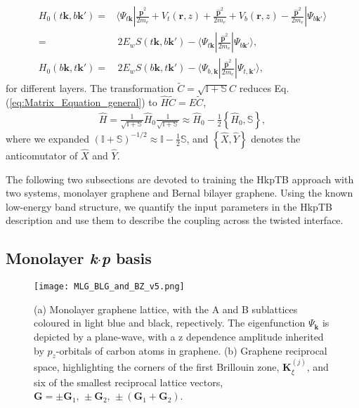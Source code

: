 \documentclass[showpacs,aps,prb,reprint,twocolumn]{revtex4-1}
\begin{document}
\begin{subequations}\label{eq:H0_general}
\begin{align}
H_0(t\boldsymbol{k},b\boldsymbol{k}')\!=&
\langle \Psi_{t\boldsymbol{k}}
|\frac{\hat{\boldsymbol{p}}^2}{2m_e}\!+\!
V_{t}(\boldsymbol{r},z)\!+\!
\frac{\hat{\boldsymbol{p}}^2}{2m_e}\!+\!
V_{b}(\boldsymbol{r},z)\!-\!
\frac{\hat{\boldsymbol{p}}^2}{2m_e}|
\Psi_{b\boldsymbol{k}'}\rangle\nonumber\\
=&\,2E_wS(t\boldsymbol{k},b\boldsymbol{k}')-
\langle \Psi_{t\boldsymbol{k}}
|\frac{\hat{\boldsymbol{p}}^2}{2m_e}|
\Psi_{b\boldsymbol{k}'}\rangle,\\
H_0(b\boldsymbol{k},t\boldsymbol{k}')\!
=&\,2E_wS(b\boldsymbol{k},t\boldsymbol{k}')-
\langle \Psi_{b,\boldsymbol{k}}
|\frac{\hat{\boldsymbol{p}}^2}{2m_e}|
\Psi_{t,\boldsymbol{k}'}\rangle,
\end{align}
\end{subequations}
for different layers. The transformation $\tilde{C}=\sqrt{\mathbb{I}+\mathbb{S}}{C}$ reduces Eq. (\ref{eq:Matrix_Equation_general}) to $\hat{H}\tilde{C}=E\tilde{C}$,
\begin{align}\label{eq:H_general}
\hat{H}=
\frac{1}{\sqrt{\mathbb{I}+\mathbb{S}}}
\hat{H}_{0}
\frac{1}{\sqrt{\mathbb{I}+\mathbb{S}}}
\approx \hat{H}_{0}-
\frac{1}{2}
\left\{\hat{H}_0,\mathbb{S}
\right\},
\end{align}
where we expanded $(\mathbb{I}+\mathbb{S})^{-1/2}\approx\mathbb{I}-\frac{1}{2}\mathbb{S}$, and $\left\{\hat{X},\hat{Y}\right\}$ denotes the anticomutator of $\hat{X}$ and $\hat{Y}$.

The following two subsections are devoted to training the HkpTB approach with two systems, monolayer graphene and Bernal bilayer graphene. Using the known low-energy band structure, we quantify the input parameters in the HkpTB description and use them to describe the coupling across the twisted interface.
\subsection{Monolayer \textit{k}$\cdot$\textit{p} basis}
\label{sec:slg}

\begin{figure}
\begin{center}
\texttt{[image: MLG\_BLG\_and\_BZ\_v5.png]}
\caption{ (a) Monolayer graphene lattice, with the A and B sublattices coloured in light blue and black, repectively. The eigenfunction $\Psi_{\boldsymbol{k}}$ is depicted by a plane-wave, with a z dependence amplitude inherited by $p_z$-orbitals of carbon atoms in graphene. (b) Graphene reciprocal space, highlighting the corners of the first Brillouin zone, $\boldsymbol{K}_\xi^{(j)}$, and six of the smallest reciprocal lattice vectors, $\boldsymbol{G}=\pm\boldsymbol{G}_1,\,\pm\boldsymbol{G}_2,\,\pm(\boldsymbol{G}_1+\boldsymbol{G}_2)$. \label{fig:MLG_BLG_and_BZ}}
\end{center}
\end{figure}
\end{document}
